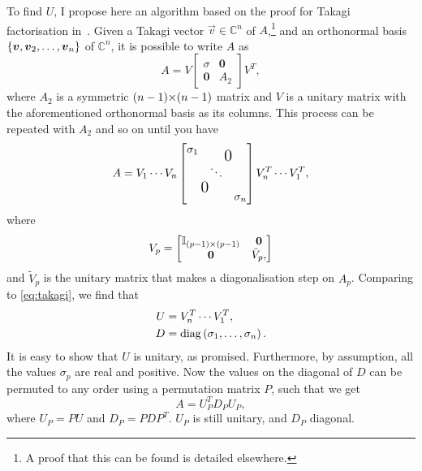 \documentclass[../main.tex]{subfiles}
\begin{document}
To find \(U\), I propose here an algorithm based on the proof for Takagi factorisation in~\cite{Horn}.
Given a Takagi vector \(\vec{v} \in \mathbb{C}^n\) of \(A\),\footnote{A proof that this can be found is detailed elsewhere.} and an orthonormal basis \(\left\{\boldsymbol{v}, \boldsymbol{v}_2, \ldots, \boldsymbol{v}_n\right\}\) of \(\mathbb{C}^n\), it is possible to write \(A\) as
\[
  A = V \begin{bmatrix}
    \sigma         & \boldsymbol{0} \\
    \boldsymbol{0} & A_2
  \end{bmatrix} V^T,
\]
where \(A_2\) is a symmetric \((n-1) {\times} (n-1)\) matrix and \(V\) is a unitary matrix with the aforementioned orthonormal basis as its columns.
This process can be repeated with \(A_2\) and so on until you have
\[
  A = V_1 \cdots V_{n} \begin{bmatrix}
    \sigma_1                                            & \multicolumn{2}{c}{\raisebox{-7pt}{\mbox{\Large 0}}}   \\
                                                        & \ddots                                               & \\
    \multicolumn{2}{c}{\raisebox{7pt}{\mbox{\Large 0}}} & \sigma_n
  \end{bmatrix} V_{n}^T \cdots V_{1}^T,
\]
where
\[
  V_p = \begin{bmatrix}
    \mathbb{I}_{(p-1) {\times} (p-1)} & \boldsymbol{0} \\
    \boldsymbol{0}               & \tilde{V}_p,
  \end{bmatrix}
\]
and \(\tilde{V}_p\) is the unitary matrix that makes a diagonalisation step on \(A_p\).
Comparing to \cref{eq:takagi}, we find that
\begin{subequations}
  \begin{align}
    U & = V_{n}^T \cdots V_{1}^T,                                  \\
    D & = \operatorname{diag}\left(\sigma_1, \ldots, \sigma_n\right).
  \end{align}
\end{subequations}
It is easy to show that \(U\) is unitary, as promised.
Furthermore, by assumption, all the values \(\sigma_p\) are real and positive.
Now the values on the diagonal of \(D\) can be permuted to any order using a permutation matrix \(P\), such that we get
\[
  A = U_P^T D_P U_P,
\]
where \(U_P = P U\) and \(D_P = P D P^T\).
\(U_P\) is still unitary, and \(D_P\) diagonal.
\end{document}
